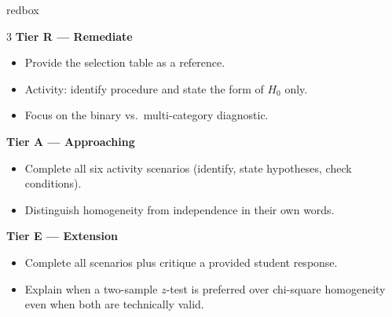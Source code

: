 \documentclass[10pt]{article}
\begin{document}
\begin{skillbox}{redbox}
\begin{multicols}{3}
    \textbf{Tier R --- Remediate}
    \begin{itemize}
        \item Provide the selection table as a reference.
        \item Activity: identify procedure and state the form of $H_0$ only.
        \item Focus on the binary vs.\ multi-category diagnostic.
    \end{itemize}
    \columnbreak
    \textbf{Tier A --- Approaching}
    \begin{itemize}
        \item Complete all six activity scenarios (identify, state hypotheses, check conditions).
        \item Distinguish homogeneity from independence in their own words.
    \end{itemize}
    \columnbreak
    \textbf{Tier E --- Extension}
    \begin{itemize}
        \item Complete all scenarios plus critique a provided student response.
        \item Explain when a two-sample $z$-test is preferred over chi-square homogeneity
              even when both are technically valid.
    \end{itemize}
\end{multicols}
\end{skillbox}
\end{document}
